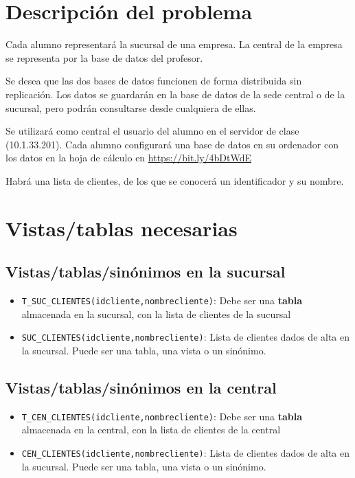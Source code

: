 \documentclass[a4paper]{article}
\begin{document}
\section{Descripción del problema}
\label{sec:org0000003}
Cada alumno representará la sucursal de una empresa. La central de la empresa se representa por la base de datos del profesor.

Se desea que las dos bases de datos funcionen de forma distribuida sin replicación. Los datos se guardarán en la base de datos de la sede central o de la sucursal, pero podrán consultarse desde cualquiera de ellas.

Se utilizará como central el usuario del alumno en el servidor de clase (10.1.33.201). Cada alumno configurará una base de datos en su ordenador con los datos en la hoja de cálculo en \url{https://bit.ly/4bDtWdE}

Habrá una lista de clientes, de los que se conocerá un identificador y su nombre.

\newpage
\section{Vistas/tablas necesarias}
\label{sec:org000000f}
\subsection{Vistas/tablas/sinónimos en la sucursal}
\label{sec:org0000006}
\begin{itemize}
\item \texttt{T\_SUC\_CLIENTES(idcliente,nombrecliente)}: Debe ser una \textbf{tabla} almacenada en la sucursal, con la lista de clientes de la sucursal
\item \texttt{SUC\_CLIENTES(idcliente,nombrecliente)}: Lista de clientes dados de alta en la sucursal. Puede ser una tabla, una vista o un sinónimo.
\end{itemize}

\subsection{Vistas/tablas/sinónimos en la central}
\label{sec:org0000009}
\begin{itemize}
\item \texttt{T\_CEN\_CLIENTES(idcliente,nombrecliente)}: Debe ser una \textbf{tabla} almacenada en la central, con la lista de clientes de la central
\item \texttt{CEN\_CLIENTES(idcliente,nombrecliente)}: Lista de clientes dados de alta en la sucursal. Puede ser una tabla, una vista o un sinónimo.
\end{itemize}
\end{document}
